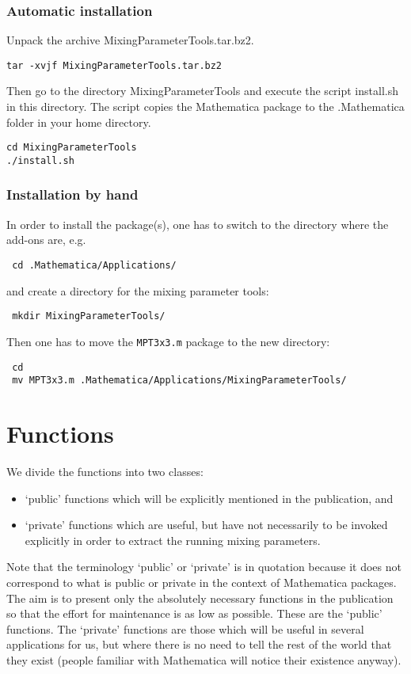 \documentclass[12pt,a4paper,twoside]{scrartcl}
\newcommand{\package}[1]{{\tt #1}}
\numberwithin{equation}{section}
\numberwithin{table}{section}
\begin{document}
\subsubsection{Automatic installation}

Unpack the archive MixingParameterTools.tar.bz2.
\begin{verbatim}
tar -xvjf MixingParameterTools.tar.bz2
\end{verbatim}
Then go to the directory MixingParameterTools and execute the script install.sh in
this directory. The script copies the Mathematica package to the .Mathematica
folder in your home directory.
\begin{verbatim}
cd MixingParameterTools
./install.sh
\end{verbatim}

\subsubsection{Installation by hand}

In order to install the package(s), one has to switch to the directory where the
add-ons are, e.g.\
\begin{verbatim}
 cd .Mathematica/Applications/
\end{verbatim}
and create a directory for the mixing parameter tools:
\begin{verbatim}
 mkdir MixingParameterTools/
\end{verbatim}
Then one has to move the \package{MPT3x3.m} package to the new directory:
\begin{verbatim}
 cd
 mv MPT3x3.m .Mathematica/Applications/MixingParameterTools/
\end{verbatim}


\section{Functions}

We divide the functions into two classes:
\begin{itemize}
 \item `public' functions which will be explicitly mentioned in the publication, 
  and
 \item `private' functions which are useful, but have not necessarily to be
  invoked explicitly in order to extract the running mixing parameters.
\end{itemize}
Note that the terminology `public' or `private' is in quotation because it does
not correspond to what is public or private in the context of Mathematica
packages. The aim is to present only the absolutely necessary functions in the
publication so that the effort for maintenance is as low as possible. These are
the `public' functions. The `private' functions are those which will be useful
in several applications for us, but where there is no need to tell the rest of
the world that they exist (people familiar with Mathematica will notice their
existence anyway).
\end{document}
